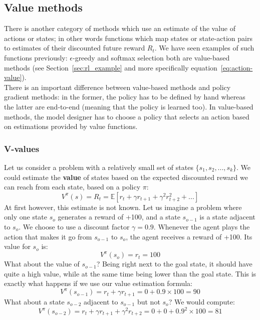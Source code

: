 \subsection{Value methods}
There is another category of methods which use an estimate of the value of
actions or states; in other words functions which map states or state-action
pairs to estimates of their discounted future reward $R_t$. We have seen
examples of such functions previously: $\epsilon$-greedy and softmax
selection both are value-based methods (see Section~\ref{sec:rl_example} and
more specifically equation~\ref{eq:action-value}).\\

There is an important
difference between value-based methods and policy gradient methods: in the
former, the policy has to be defined by hand whereas the latter are
end-to-end (meaning that the policy is learned too). In value-based methods,
the model designer has to choose a policy that selects an action based
on estimations provided by value functions.\\

\subsubsection{V-values} 
Let us consider a problem with a relatively small set of states 
$\{s_1, s_2, ..., s_k\}$. We could estimate the \textbf{value} of 
states based on the expected discounted reward we can reach from each state, 
based on a policy $\pi$: 
$$ V^\pi(s) = R_t = \mathbb{E}
   \left[ r_t + \gamma r_{t+1} + \gamma^2 r_{t+2}^2 + ...  \right]$$
At first however, this estimate is not known. Let us imagine a problem where
only one state $s_o$ generates a reward of +100, and a state $s_{o-1}$ is a state
adjacent to $s_o$. We choose to use a discount factor $\gamma = 0.9$. 
Whenever the agent plays the action that makes it go from
$s_{o-1}$ to $s_o$, the agent receives a reward of +100. Its value for $s_o$ is:
$$V^\pi(s_o) = r_t = 100$$
What about the value of $s_{o-1}$? Being right next to the goal state, it should
have quite a high value, while at the same time being lower than the goal state.
This is exactly what happens if we use our value estimation formula:
$$V^\pi(s_{o-1}) = r_t + \gamma r_{t+1} = 0+ 0.9 \times 100 = 90$$
What about a state $s_{o-2}$ adjacent to $s_{o-1}$ but not $s_{o}$? We would
compute:
$$V^\pi(s_{o-2}) = r_t + \gamma r_{t+1} + \gamma^2 r_{t+2} = 0+ 0 + 0.9^2 \times 100 = 81$$

